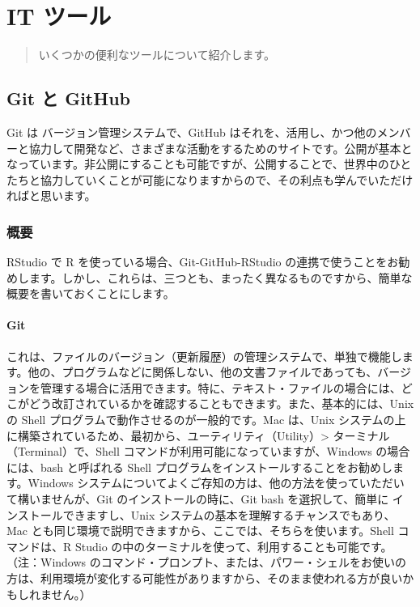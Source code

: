 \documentclass[
]{bxjsbook}
\theoremstyle{definition}
\theoremstyle{definition}
\theoremstyle{definition}
\theoremstyle{definition}
\theoremstyle{remark}
\begin{document}
\hypertarget{tools}{%
\section{IT ツール}\label{tools}}

\begin{quote}
いくつかの便利なツールについて紹介します。
\end{quote}

\hypertarget{git-ux3068-github}{%
\subsection{Git と GitHub}\label{git-ux3068-github}}

Git は バージョン管理システムで、GitHub はそれを、活用し、かつ他のメンバーと協力して開発など、さまざまな活動をするためのサイトです。公開が基本となっています。非公開にすることも可能ですが、公開することで、世界中のひとたちと協力していくことが可能になりますからので、その利点も学んでいただければと思います。

\hypertarget{ux6982ux8981}{%
\subsubsection{概要}\label{ux6982ux8981}}

RStudio で R を使っている場合、Git-GitHub-RStudio の連携で使うことをお勧めします。しかし、これらは、三つとも、まったく異なるものですから、簡単な概要を書いておくことにします。

\hypertarget{git}{%
\paragraph{Git}\label{git}}

これは、ファイルのバージョン（更新履歴）の管理システムで、単独で機能します。他の、プログラムなどに関係しない、他の文書ファイルであっても、バージョンを管理する場合に活用できます。特に、テキスト・ファイルの場合には、どこがどう改訂されているかを確認することもできます。また、基本的には、Unix の Shell プログラムで動作させるのが一般的です。Mac は、Unix システムの上に構築されているため、最初から、ユーティリティ（Utility）\textgreater{} ターミナル（Terminal）で、Shell コマンドが利用可能になっていますが、Windows の場合には、bash と呼ばれる Shell プログラムをインストールすることをお勧めします。Windows システムについてよくご存知の方は、他の方法を使っていただいて構いませんが、Git のインストールの時に、Git bash を選択して、簡単に インストールできますし、Unix システムの基本を理解するチャンスでもあり、Mac とも同じ環境で説明できますから、ここでは、そちらを使います。Shell コマンドは、R Studio の中のターミナルを使って、利用することも可能です。（注：Windows のコマンド・プロンプト、または、パワー・シェルをお使いの方は、利用環境が変化する可能性がありますから、そのまま使われる方が良いかもしれません。）
\end{document}
